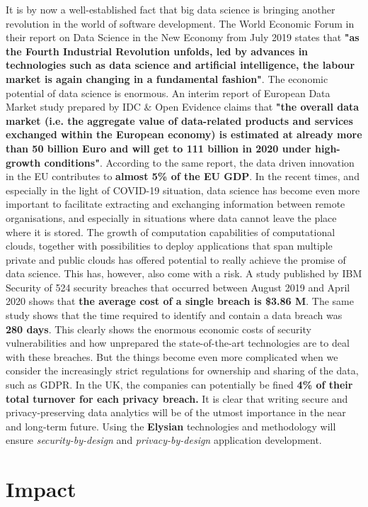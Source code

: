 \documentclass[a4paper,11pt]{article}
\newcommand{\project}[1]{\textbf{#1}\xspace}
\newcommand{\SECURITY}{\project{Elysian}}
\newcommand{\TheProject}{\SECURITY}
\begin{document}
It is by now a well-established fact that big data science is bringing another revolution in the world of software development. The World Economic Forum in their report on Data Science in the New Economy from July 2019 states that \textbf{"as the Fourth Industrial Revolution unfolds, led by advances in technologies such as data science and artificial intelligence, the labour market is again changing in a fundamental fashion"}. The economic potential of data science is enormous. An interim report of European Data Market study prepared by IDC \& Open Evidence claims that \textbf{"the overall data market (i.e. the aggregate value of data-related products and services exchanged within the European economy) is estimated at already more than 50 billion Euro and will get to 111 billion in 2020 under high-growth conditions"}. According to the same report, the data driven innovation in the EU contributes to \textbf{almost 5\% of the EU GDP}. In the recent times, and especially in the light of COVID-19 situation, data science has become even more important to facilitate extracting and exchanging information between remote organisations, and especially in situations where data cannot leave the place where it is stored. The growth of computation capabilities of computational clouds, together with possibilities to deploy applications that span multiple private and public clouds has offered potential to really achieve the promise of data science. This has, however, also come with a risk. A study published by IBM Security of 524 security breaches that occurred between August 2019 and April 2020 shows that \textbf{the average cost of a single breach is \$3.86 M}. The same study shows that the time required to identify and contain a data breach was \textbf{280 days}. This clearly shows the enormous economic costs of security vulnerabilities and how unprepared the state-of-the-art technologies are to deal with these breaches. But the things become even more complicated when we consider the increasingly strict regulations for ownership and sharing of the data, such as GDPR. In the UK, the companies can potentially be fined \textbf{4\% of their total turnover for each privacy breach.} It is clear that writing secure and privacy-preserving data analytics will be of the utmost importance in the near and long-term future. Using the \TheProject{} technologies and methodology will ensure \emph{security-by-design} and \emph{privacy-by-design} application development.  
\clearpage
\section{Impact}
\label{sec:impact}
\end{document}
